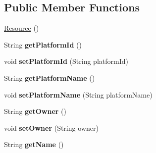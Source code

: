 \subsection*{Public Member Functions}
\begin{DoxyCompactItemize}
\item 
\hyperlink{classeu_1_1h2020_1_1symbiote_1_1model_1_1Resource_a18db6b9a6779a00b03f700b26bf7840b}{Resource} ()
\item 
String {\bfseries get\+Platform\+Id} ()\hypertarget{classeu_1_1h2020_1_1symbiote_1_1model_1_1Resource_a97e847fb787ea9fe1d16d8bd702deece}{}\label{classeu_1_1h2020_1_1symbiote_1_1model_1_1Resource_a97e847fb787ea9fe1d16d8bd702deece}

\item 
void {\bfseries set\+Platform\+Id} (String platform\+Id)\hypertarget{classeu_1_1h2020_1_1symbiote_1_1model_1_1Resource_a4f3c37b066d6e6587912fa1f1240048f}{}\label{classeu_1_1h2020_1_1symbiote_1_1model_1_1Resource_a4f3c37b066d6e6587912fa1f1240048f}

\item 
String {\bfseries get\+Platform\+Name} ()\hypertarget{classeu_1_1h2020_1_1symbiote_1_1model_1_1Resource_a87d7e26eda9ec8f69fbbfe82518b952d}{}\label{classeu_1_1h2020_1_1symbiote_1_1model_1_1Resource_a87d7e26eda9ec8f69fbbfe82518b952d}

\item 
void {\bfseries set\+Platform\+Name} (String platform\+Name)\hypertarget{classeu_1_1h2020_1_1symbiote_1_1model_1_1Resource_ab43928cc8d353b0926b394222df62b03}{}\label{classeu_1_1h2020_1_1symbiote_1_1model_1_1Resource_ab43928cc8d353b0926b394222df62b03}

\item 
String {\bfseries get\+Owner} ()\hypertarget{classeu_1_1h2020_1_1symbiote_1_1model_1_1Resource_a0bd495e4c9a10fac6e885de268b5ad76}{}\label{classeu_1_1h2020_1_1symbiote_1_1model_1_1Resource_a0bd495e4c9a10fac6e885de268b5ad76}

\item 
void {\bfseries set\+Owner} (String owner)\hypertarget{classeu_1_1h2020_1_1symbiote_1_1model_1_1Resource_a4391365a9ef765fb9c96e8243a45fafb}{}\label{classeu_1_1h2020_1_1symbiote_1_1model_1_1Resource_a4391365a9ef765fb9c96e8243a45fafb}

\item 
String {\bfseries get\+Name} ()\hypertarget{classeu_1_1h2020_1_1symbiote_1_1model_1_1Resource_a7332986d4dfa4ca233f705659f166f2c}{}\label{classeu_1_1h2020_1_1symbiote_1_1model_1_1Resource_a7332986d4dfa4ca233f705659f166f2c}


\end{DoxyCompactItemize}
